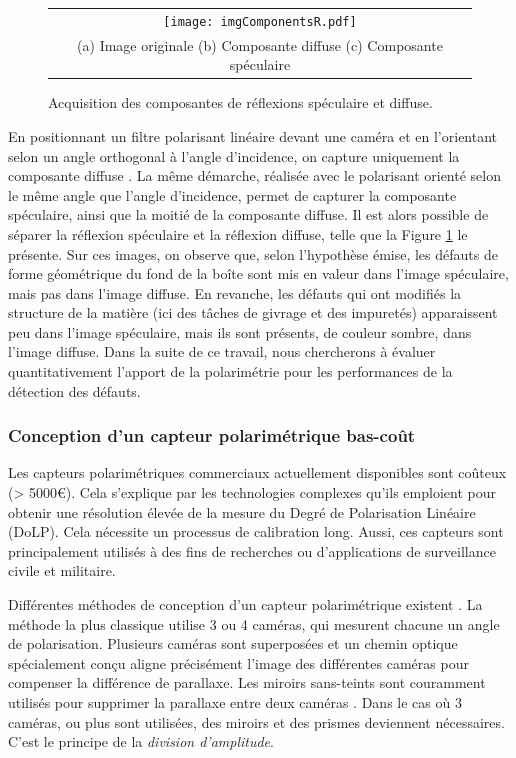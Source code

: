 \begin{figure}[bhtp]
	\begin{center}
		\begin{tabular}{c}
			\texttt{[image: imgComponentsR.pdf]}
			\\
			(a) Image originale \hspace{1.4cm} (b) Composante diffuse \hspace{1.4cm} (c) Composante spéculaire
		\end{tabular}
	\end{center}
	\caption{Acquisition des composantes de réflexions spéculaire et diffuse.}
	\label{fig:specular_diffuse}
\end{figure}
En positionnant un filtre polarisant linéaire devant une caméra et en l'orientant selon un angle orthogonal à l'angle d'incidence, on capture uniquement la composante diffuse \cite{debevec_acquiring_2000}.
La même démarche, réalisée avec le polarisant orienté selon le même angle que l'angle d'incidence, permet de capturer la composante spéculaire, ainsi que la moitié de la composante diffuse.
Il est alors possible de séparer la réflexion spéculaire et la réflexion diffuse, telle que la Figure \ref{fig:specular_diffuse} le présente.
Sur ces images, on observe que, selon l'hypothèse émise, les défauts de forme géométrique du fond de la boîte sont mis en valeur dans l'image spéculaire, mais pas dans l'image diffuse.
En revanche, les défauts qui ont modifiés la structure de la matière (ici des tâches de givrage et des impuretés) apparaissent peu dans l'image spéculaire, mais ils sont présents, de couleur sombre, dans l'image diffuse.
Dans la suite de ce travail, nous chercherons à évaluer quantitativement l'apport de la polarimétrie pour les performances de la détection des défauts.

\subsubsection{Conception d'un capteur polarimétrique bas-coût}
Les capteurs polarimétriques commerciaux actuellement disponibles sont coûteux (> 5000€).
Cela s'explique par les technologies complexes qu'ils emploient pour obtenir une résolution élevée de la mesure du Degré de Polarisation Linéaire (DoLP).
Cela nécessite un processus de calibration long.
Aussi, ces capteurs sont principalement utilisés à des fins de recherches ou d'applications de surveillance civile et militaire.

Différentes méthodes de conception d'un capteur polarimétrique existent \cite{tyo_review_2006}.
La méthode la plus classique utilise 3 ou 4 caméras, qui mesurent chacune un angle de polarisation.
Plusieurs caméras sont superposées et un chemin optique spécialement conçu aligne précisément l'image des différentes caméras pour compenser la différence de parallaxe.
Les miroirs sans-teints sont couramment utilisés pour supprimer la parallaxe entre deux caméras \cite{wolff_polarization_1995}.
Dans le cas où 3 caméras, ou plus sont utilisées, des miroirs et des prismes deviennent nécessaires.
C'est le principe de la \textit{division d'amplitude}.

